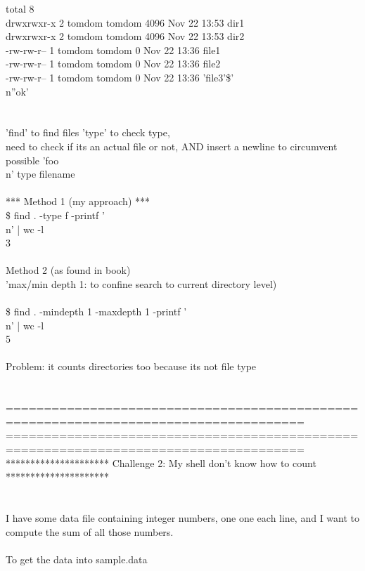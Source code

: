 \documentclass[10pt,a4paper]{article}
\begin{document}
{total 8\\
drwxrwxr-x 2 tomdom tomdom 4096 Nov 22 13:53  dir1\\
drwxrwxr-x 2 tomdom tomdom 4096 Nov 22 13:53  dir2\\
-rw-rw-r-- 1 tomdom tomdom    0 Nov 22 13:36  file1\\
-rw-rw-r-- 1 tomdom tomdom    0 Nov 22 13:36  file2\\
-rw-rw-r-- 1 tomdom tomdom    0 Nov 22 13:36 'file3'\$'\\n''ok'\\
\\
\\
'find'  to find files 'type' to check type, \\
need to check if its an actual file or not, AND insert a newline to circumvent possible 'foo\\n' type filename\\
\\
***  Method 1 (my approach) ***\\
\$ find . -type f -printf '\\n' | wc -l\\
3\\
\\
Method 2 (as found in book)\\
		 'max/min depth 1: to confine search to current directory level)\\
\\
\$ find . -mindepth 1 -maxdepth 1 -printf '\\n' | wc -l\\
5\\
\\
Problem: it counts directories too because its not file type\\
\\
\\
=====================================================================================\\
=====================================================================================\\
*********************  Challenge 2: My shell don't know how to count *********************  \\
\\
\\
I have some data file containing integer numbers, one one each line, and I want to compute the sum of all those numbers.\\
\\
To get the data into sample.data\\
}
\end{document}
